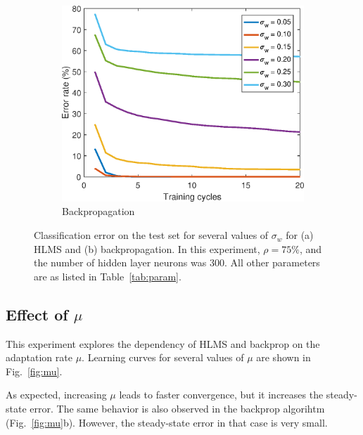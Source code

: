 \documentclass[a4paper]{article}
\begin{document}
\begin{figure}[h!]
	\begin{subfigure}[h!]{0.75\textwidth}
		\includegraphics[width=\textwidth]{w0_bp_300.eps}
		\caption{Backpropagation}
	\end{subfigure}
	\caption{Classification error on the test set for several values of $\sigma_w$ for (a) HLMS and (b) backpropagation. In this experiment, $\rho = 75\%$, and the number of hidden layer neurons was 300. All other parameters are as listed in Table~\ref{tab:param}. } \label{fig:w02}
\end{figure}
\FloatBarrier

\subsection*{Effect of $\mu$}

This experiment explores the dependency of HLMS and backprop on the adaptation rate $\mu$. Learning curves for several values of $\mu$ are shown in Fig.~\ref{fig:mu}. 

As expected, increasing $\mu$ leads to faster convergence, but it increases the steady-state error. The same behavior is also observed in the backprop algorihtm (Fig.~\ref{fig:mu}b). However, the steady-state error in that case is very small.
\end{document}
